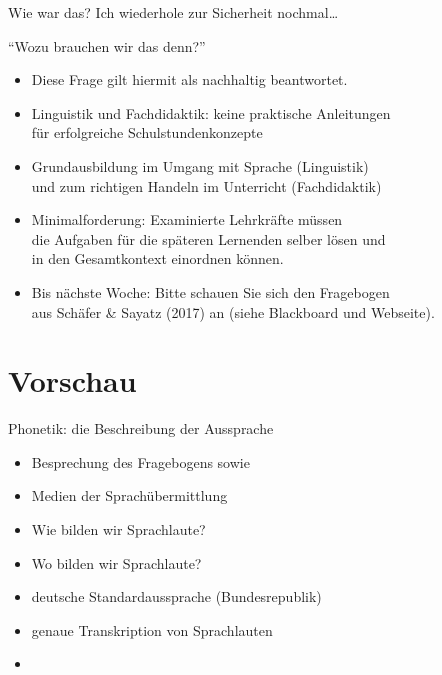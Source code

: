 \begin{frame}
  {Wie war das?}
  Ich wiederhole zur Sicherheit nochmal\ldots\\
  \vspace{\baselineskip}
  \pause
  \begin{center}
    \Large{}
  \end{center}
\end{frame}

\begin{frame}
  {"`Wozu brauchen wir das denn?"'}
  \pause
  \begin{itemize}[<+->]
    \item Diese Frage gilt hiermit als nachhaltig beantwortet.
    \item Linguistik und Fachdidaktik: keine praktische Anleitungen\\
      für erfolgreiche Schulstundenkonzepte
    \item Grundausbildung im \alert{Umgang mit Sprache} (Linguistik)\\
      und zum \alert{richtigen Handeln im Unterricht} (Fachdidaktik)
      \vspace{\baselineskip}
    \item Minimalforderung: \alert{Examinierte Lehrkräfte müssen\\
      die Aufgaben für die späteren Lernenden selber lösen und\\
      in den Gesamtkontext einordnen können.}
    \item \alert{Bis nächste Woche: Bitte schauen Sie sich den Fragebogen\\
      aus Schäfer \& Sayatz (2017) an (siehe Blackboard und Webseite).}
  \end{itemize}
\end{frame}

\section{Vorschau}

\begin{frame}
  {Phonetik: die Beschreibung der Aussprache}

  \begin{itemize}[<+->]
    \item Besprechung des Fragebogens sowie \citet{SchaeferSayatz2017a}
      \Zeile
    \item Medien der Sprachübermittlung
    \item Wie bilden wir Sprachlaute?
    \item Wo bilden wir Sprachlaute?
    \item deutsche Standardaussprache (Bundesrepublik)
    \item genaue Transkription von Sprachlauten
      \Zeile
    \item {}
  \end{itemize}

  \pause
  \pause
  \pause
  \pause
  \pause
\end{frame}
